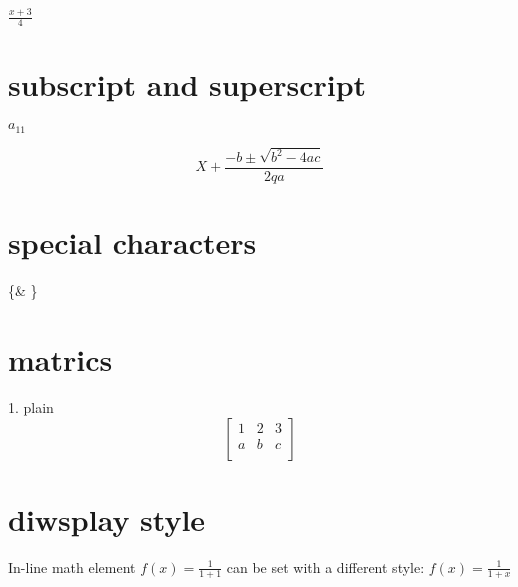 \documentclass[12pt]{book}
\begin{document}
$\frac{x+3}{4}$

\section{subscript and superscript}

$ a_{11} $

$$ X + \frac{-b \pm \sqrt{b^2-4ac}}{2qa} $$

\section{special characters}

\{\& \}

\section{matrics}

1. plain\\

$$
\begin{bmatrix}
1 & 2 & 3\\
a & b & c\\
\end{bmatrix}
$$

\section{diwsplay style}

In-line math element $f(x)=\frac{1}{1+1}$ can be set with a different style: $
f(x)=\displaystyle\frac{1}{1+x}$
\end{document}
